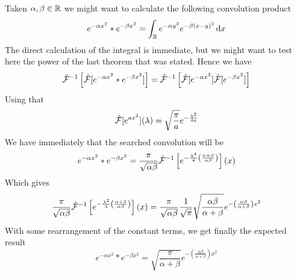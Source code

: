 \documentclass[../complete.tex]{subfiles}
\begin{document}
\begin{eg}
	Taken $\alpha,\beta\in\mathbb{R}$ we might want to calculate the following convolution product
	\begin{equation*}
		e^{-\alpha x^2}*e^{-\beta x^2}=\int_{\mathbb{R}}^{}e^{-\alpha y^2}e^{-\beta(x-y)^2}\operatorname{d\!} x
	\end{equation*}
	The direct calculation of the integral is immediate, but we might want to test here the power of the last theorem that was stated. Hence we have
	\begin{equation*}
		\hat{\mathcal{F}}^{-1}\left[ \hat{\mathcal{F}}[e^{-\alpha x^2}*e^{-\beta x^2}] \right]=\hat{\mathcal{F}}^{-1}\left[ \hat{\mathcal{F}}[e^{-\alpha x^2}]\hat{\mathcal{F}}[e^{-\beta x^2}] \right]
	\end{equation*}
	Using that
	\begin{equation*}
		\hat{\mathcal{F}}[e^{ax^2}](\lambda)=\sqrt{\frac{\pi}{a}}e^{-\frac{\lambda^2}{4a}}
	\end{equation*}
	We have immediately that the searched convolution will be
	\begin{equation*}
		e^{-\alpha x^2}*e^{-\beta x^2}=\frac{\pi}{\sqrt{\alpha\beta}}\hat{\mathcal{F}}^{-1}\left[ e^{-\frac{\lambda^4}{4}\left(\frac{\alpha+\beta}{\alpha\beta}\right)} \right](x)
	\end{equation*}
	Which gives
	\begin{equation*}
		\frac{\pi}{\sqrt{\alpha\beta}}\hat{\mathcal{F}}^{-1}\left[ e^{-\frac{\lambda^2}{4}\left( \frac{\alpha+\beta}{\alpha\beta} \right)} \right](x)=\frac{\pi}{\sqrt{\alpha\beta}}\frac{1}{\sqrt{\pi}}\sqrt{\frac{\alpha\beta}{\alpha+\beta}}e^{-\left( \frac{\alpha\beta}{\alpha+\beta} \right)x^2}
	\end{equation*}
	With some rearrangement of the constant terms, we get finally the expected result
	\begin{equation*}
		e^{-\alpha x^2}*e^{-\beta x^2}=\sqrt{\frac{\pi}{\alpha+\beta}}e^{-\left( \frac{\alpha\beta}{\alpha+\beta} \right)x^2}
	\end{equation*}
\end{eg}
\end{document}
